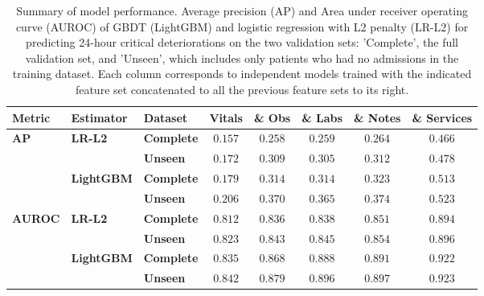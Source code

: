 \documentclass[fleqn,10pt]{wlscirep}
\begin{document}
\begin{table}[htbp]
    \renewcommand{\arraystretch}{1.2}
    \centering
    \begin{tabular}{lll|ccccc}
        \toprule
        \textbf{Metric}                 & \textbf{Estimator}                 & \textbf{Dataset}  & Vitals  & \& Obs  & \& Labs & \& Notes & \& Services  \\

        \midrule
        \multirow{4}{*}{\textbf{AP}}    & \multirow{2}{*}{\textbf{LR-L2}}    & \textbf{Complete} & $0.157$ & $0.258$ & $0.259$ & $0.264$  & $0.466$      \\
                                        &                                    & \textbf{Unseen}   & $0.172$ & $0.309$ & $0.305$ & $0.312$  & $0.478$      \\
        \cline{2-8}
                                        & \multirow{2}{*}{\textbf{LightGBM}} & \textbf{Complete} & $0.179$ & $0.314$ & $0.314$ & $0.323$  & $\bm{0.513}$ \\
                                        &                                    & \textbf{Unseen}   & $0.206$ & $0.370$ & $0.365$ & $0.374$  & $\bm{0.523}$ \\
        \cline{1-8}
        \multirow{4}{*}{\textbf{AUROC}} & \multirow{2}{*}{\textbf{LR-L2}}    & \textbf{Complete} & $0.812$ & $0.836$ & $0.838$ & $0.851$  & $0.894$      \\
                                        &                                    & \textbf{Unseen}   & $0.823$ & $0.843$ & $0.845$ & $0.854$  & $0.896$      \\
        \cline{2-8}
                                        & \multirow{2}{*}{\textbf{LightGBM}} & \textbf{Complete} & $0.835$ & $0.868$ & $0.888$ & $0.891$  & $\bm{0.922}$ \\
                                        &                                    & \textbf{Unseen}   & $0.842$ & $0.879$ & $0.896$ & $0.897$  & $\bm{0.923}$ \\
        \bottomrule
    \end{tabular}
    \caption{\label{tab:summary_results} Summary of model performance. Average precision (AP) and Area under receiver operating curve (AUROC) of GBDT (LightGBM) and logistic regression with L2 penalty (LR-L2) for predicting 24-hour critical deteriorations on the two validation sets: 'Complete', the full validation set, and 'Unseen', which includes only patients who had no admissions in the training dataset. Each column corresponds to independent models trained with the indicated feature set concatenated to all the previous feature sets to its right.}
\end{table}
\end{document}
